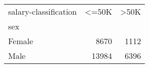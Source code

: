\begin{tabular}{lrr}
\toprule
salary-classification &   <=50K &   >50K \\
sex     &         &        \\
\midrule
 Female &    8670 &   1112 \\
 Male   &   13984 &   6396 \\
\bottomrule
\end{tabular}
